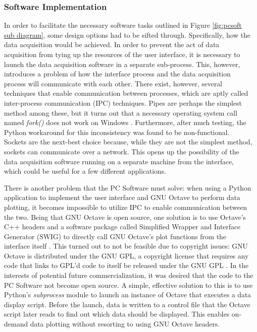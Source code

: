 \subsubsection[Software Implementation]{Software Implementation}
In order to facilitate the necessary software tasks outlined in Figure 
\ref{fig:pcsoft sub diagram}, some design options had to be sifted through. Specifically, 
how the data acquisition would be achieved. In order to prevent the act of data 
acquisition from tying up the resources of the user interface, it is necessary to launch 
the data acquisition software in a separate sub-process. This, however, introduces a 
problem of how the interface process and the data acquisition process will communicate with 
each other. There exist, however, several techniques that enable communication between 
processes, which are aptly called inter-process communication (IPC) techniques. Pipes are 
perhaps the simplest method among these, but it turns out that a necessary operating system 
call named \textit{fork()} does not work on Windows \cite{web:windowsfork}. Furthermore, 
after much testing, the Python workaround for this inconsistency was found to be non-functional. 
Sockets are the next-best choice because, while they are not the simplest method, sockets can
 communicate over a network. This opens up the possibility of the data acquisition software 
running on a separate machine from the interface, which could be useful for a few different 
applications.

There is another problem that the PC Software must solve: when using a Python application to 
implement the user interface and GNU Octave to perform data plotting, it becomes impossible to 
utilize IPC to enable communication between the two. Being that GNU Octave is open source, one 
solution is to use Octave's C++ headers and a software package called Simplified Wrapper and Interface
 Generator (SWIG) to directly call  GNU Octave's plot functions from the interface itself \cite{web:swig}. 
This turned out to not be feasible due to copyright issues: GNU Octave is distributed under the GNU 
GPL, a copyright license that requires any code that links to GPL'd code to itself be released under 
the GNU GPL \cite{web:gnugpl}. In the interests of potential future commercialization, it was desired 
that the code to the PC Software not become open source. A simple, effective solution to this is to 
use Python's \textit{subprocess} module to launch an instance of Octave that executes a data display 
script. Before the launch, data is written to a control file that the Octave script later reads 
to find out which data should be displayed. This enables on-demand data plotting without resorting 
to using GNU Octave headers.


